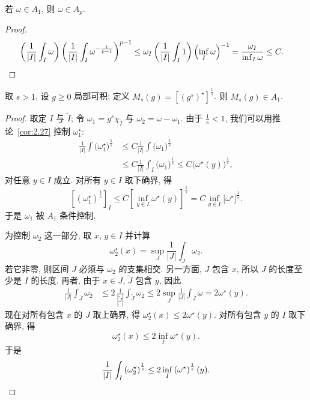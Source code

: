 \begin{lemma}\label{lem:3.15}
若 $\omega\in A_1$, 则 $\omega\in A_p$.
\end{lemma}

\begin{proof}
\begin{align*}
\left(\frac{1}{|I|}\int_{I}\omega\right)\left(\frac{1}{|I|}\int_{I}\omega^{-\frac{1}{p-1}}\right)^{p-1}
&\leq\omega_{I}\left(\frac{1}{|I|}\int_{I}1\right)\left(\inf_{I}\omega\right)^{-1}
=\frac{\omega_{I}}{\inf_{I}\omega}\leq C. \qedhere
\end{align*}
\end{proof}

\begin{corollary}\label{cor:3.16}
取 $s>1$, 设 $g\geq 0$ 局部可积; 定义 $M_s(g)=[(g^{s})^{\star}]^{\frac{1}{s}}$. 则 $M_s(g)\in A_1$.
\end{corollary}

\begin{proof}
取定 $I$ 与 $\tilde{I}$; 令 $\omega_1=g^{s}\chi_{\tilde{I}}$ 与 $\omega_2=\omega-\omega_1$. 由于 $\frac{1}{s}<1$, 我们可以用推论~\ref{cor:2.27} 控制 $\omega_1^{\star}$:
\begin{align*}
\frac{1}{|I|}\int\bigl(\omega_{1}^{\star}\bigr)^{\frac{1}{s}}
&\leq C\frac{1}{|I|}\int\bigl(\omega_{1}\bigr)^{\frac{1}{s}} \\
&\leq C\frac{1}{|I|}\int_{I}\bigl(\omega_{1}\bigr)^{\frac{1}{s}}
\leq C\bigl(\omega^{\star}(y)\bigr)^{\frac{1}{s}},
\end{align*}
对任意 $y\in I$ 成立. 对所有 $y\in I$ 取下确界, 得
\[
\left[(\omega_{1}^{\star})^{\frac{1}{s}}\right]_{I}\leq C\left[\inf_{y\in I}\omega^{\star}(y)\right]^{\frac{1}{s}}
=C\inf_{y\in I}\bigl[\omega^{\star}\bigr]^{\frac{1}{s}}.
\]
于是 $\omega_{1}$ 被 $A_{1}$ 条件控制.

为控制 $\omega_2$ 这一部分, 取 $x$, $y\in I$ 并计算
\[
\omega_{2}^{\star}(x)=\sup_{J}\frac{1}{|J|}\int_{J}\omega_{2}.
\]
若它非零, 则区间 $J$ 必须与 $\omega_2$ 的支集相交. 另一方面, $J$ 包含 $x$, 所以 $J$ 的长度至少是 $I$ 的长度. 再者, 由于 $x\in J$, $\tilde{J}$ 包含 $y$, 因此
\begin{align*}
\frac{1}{|J|}\int_{J}\omega_{2}
&\leq 2\,\frac{1}{|\tilde{J}|}\int_{\tilde{J}}\omega_{2}
\leq 2\sup_{J}\frac{1}{|J|}\int_{J}\omega=2\omega^{\star}(y).
\end{align*}
现在对所有包含 $x$ 的 $J$ 取上确界, 得 $\omega_2^{\star}(x)\leq 2\omega^{\star}(y)$. 对所有包含 $y$ 的 $I$ 取下确界, 得
\[
\omega_{2}^{\star}(x)\leq 2\inf_{I}\omega^{\star}(y).
\]
于是
\[
\frac{1}{\left|I\right|}\int_{I}\left(\omega_{2}^{\star}\right)^{\frac{1}{s}}
\leq 2\inf_{I}\left(\omega^{\star}\right)^{\frac{1}{s}}(y). \qedhere
\]
\end{proof}

